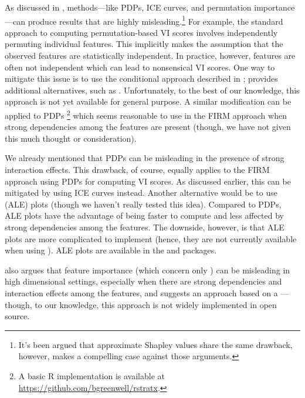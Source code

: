 As discussed in \citet{hooker-2019-stop}, 
methods---like PDPs, ICE curves, and permutation importance---can
produce results that are highly misleading.\footnote{It's been argued
  that approximate Shapley values share the same drawback, however,
  \citet{janzing-2019-feature} makes a compelling case against those
  arguments.} For example, the standard approach to computing
permutation-based VI scores involves independently permuting individual
features. This implicitly makes the assumption that the observed
features are statistically independent. In practice, however, features
are often not independent which can lead to nonsensical VI scores. One
way to mitigate this issue is to use the conditional approach described
in \citet{strobl-2019-conditional}; \citet{hooker-2019-stop} provides
additional alternatives, such as .
Unfortunately, to the best of our knowledge, this approach is not yet
available for general purpose. A similar modification can be applied to
PDPs \citep{parr-2019-technical}\footnote{A basic R implementation is
  available at \url{https://github.com/bgreenwell/rstratx}.} which seems
reasonable to use in the FIRM approach when strong dependencies among
the features are present (though, we have not given this much thought or
consideration).

We already mentioned that PDPs can be misleading in the presence of
strong interaction effects. This drawback, of course, equally applies to
the FIRM approach using PDPs for computing VI scores. As discussed
earlier, this can be mitigated by using ICE curves instead. Another
alternative would be to use  (ALE) plots
\citep{apley-2016-visualizing} (though we haven't really tested this
idea). Compared to PDPs, ALE plots have the advantage of being faster to
compute and less affected by strong dependencies among the features. The
downside, however, is that ALE plots are more complicated to implement
(hence, they are not currently available when using
). ALE plots are available in the
 \citep{R-ALEPlot} and  packages.

\citet{hooker-2007-generalized} also argues that feature importance
(which concern only ) can be misleading in high
dimensional settings, especially when there are strong dependencies and
interaction effects among the features, and suggests an approach based
on a ---though, to our
knowledge, this approach is not widely implemented in open source.

